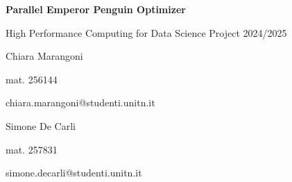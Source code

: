 \begin{center}
    \centering  %
    {\Huge\textbf{Parallel Emperor Penguin Optimizer}\par} %
    \vspace{0.5cm}
    {\Large High Performance Computing for Data Science Project 2024/2025 \par} %
    \vspace{1cm}

    \noindent
    \begin{minipage}[t]{0.5\textwidth} %
        \centering
        {\large Chiara Marangoni \par}
        {\small mat. 256144 \par}
        {\small chiara.marangoni@studenti.unitn.it \par}
    \end{minipage}%
    \hfill %
    \begin{minipage}[t]{0.5\textwidth} %
        \centering
        {\large Simone De Carli \par}
        {\small mat. 257831 \par}
        {\small simone.decarli@studenti.unitn.it \par}
    \end{minipage}
    \vspace{0.7cm}
\end{center}